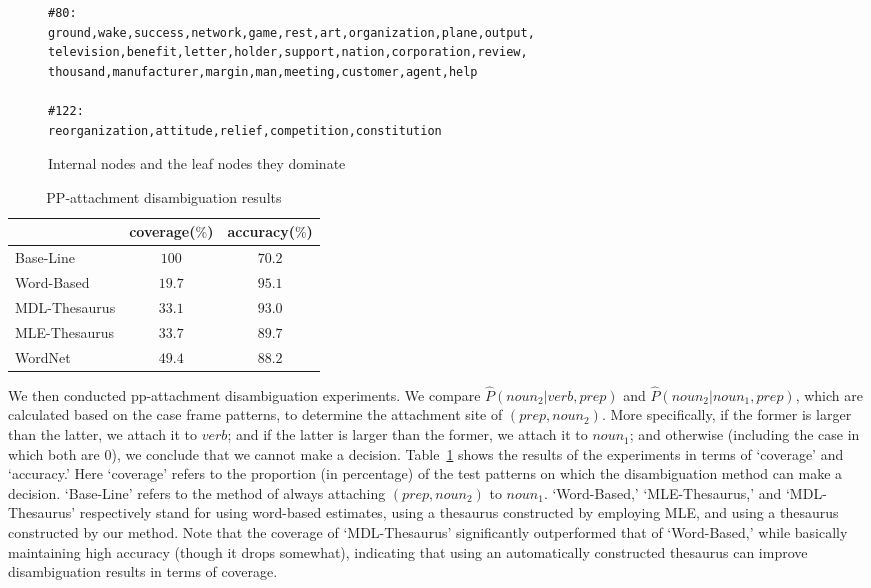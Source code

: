 \begin{figure*}[htb]
\begin{verbatim}
#80: 
ground,wake,success,network,game,rest,art,organization,plane,output,
television,benefit,letter,holder,support,nation,corporation,review,
thousand,manufacturer,margin,man,meeting,customer,agent,help

#122: 
reorganization,attitude,relief,competition,constitution
\end{verbatim}
\caption{Internal nodes and the leaf nodes they dominate}
\label{fig:part}
\end{figure*}

\begin{table}[htb]
\caption{PP-attachment disambiguation results}
\label{tb:result1}
\begin{center}
\begin{tabular}{|l|c|c|} \hline
 & coverage($\%$) & accuracy($\%$) \\ \hline
Base-Line & $100$ & $70.2$ \\
Word-Based & $19.7$ & $95.1$ \\
MDL-Thesaurus & $33.1$ & $93.0$ \\
MLE-Thesaurus & $33.7$ & $89.7$ \\
WordNet & $49.4$ & $88.2$ \\ \hline
\end{tabular}
\end{center}
\end{table}

We then conducted pp-attachment disambiguation experiments. We
compare $\hat{P}(noun_2|verb, prep)$ and $\hat{P}(noun_2| noun_1,
prep)$, which are calculated based on the case frame patterns, to
determine the attachment site of $(prep, noun_2)$.  More specifically,
if the former is larger than the latter, we attach it to $verb$; and
if the latter is larger than the former, we attach it to $noun_1$; and
otherwise (including the case in which both are $0$), we conclude that
we cannot make a decision. Table~\ref{tb:result1} shows the results of
the experiments in terms of `coverage' and `accuracy.' Here `coverage'
refers to the proportion (in percentage) of the test patterns on which
the disambiguation method can make a decision. `Base-Line' refers to
the method of always attaching $(prep,noun_2)$ to $noun_1$. 
`Word-Based,' `MLE-Thesaurus,' and `MDL-Thesaurus' respectively stand
for using word-based estimates, using a thesaurus constructed by
employing MLE, and using a thesaurus constructed by our method. Note
that the coverage of `MDL-Thesaurus' significantly outperformed that
of `Word-Based,' while basically maintaining high accuracy (though it
drops somewhat), indicating that using an automatically constructed
thesaurus can improve disambiguation results in terms of coverage.

